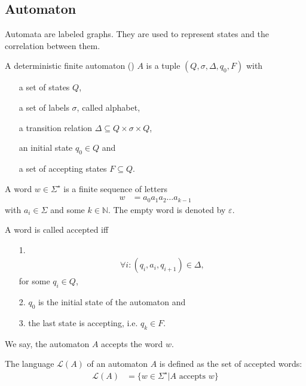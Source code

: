 \subsection{Automaton}\label{automaton_sec}
	Automata are labeled graphs. They are used to represent states and the correlation between them.
	\begin{mydef}\label{automaton}
		A \textnormal{deterministic finite automaton} (\dfa) $A$ is a tuple $(Q, \sigma, \Delta, q_0, F)$ with
		\begin{itemize}
			\item[] a set of states $Q$,
			\item [] a set of labels $\sigma$, called \textnormal{alphabet},
			\item[] a transition relation $\Delta \subseteq Q \times \sigma \times Q$,
			\item[] an initial state $q_0 \in Q$ and
			\item[] a set of accepting states $F \subseteq Q$.
		\end{itemize}
	\end{mydef}
	\begin{mydef}
		A \textnormal{word} $w \in \Sigma^{\star}$ is a finite sequence of letters
		\begin{align*}
			w	&= a_0a_1a_2 \ldots a_{k - 1}
		\end{align*}
		with $a_i \in \Sigma$ and some $k \in \mathbb{N}$. The empty word is denoted by $\varepsilon$.
		
		A word is called \textnormal{accepted} iff
		\begin{itemize}
			\item[1.] \begin{align*}
					\forall i: (q_i, a_i, q_{i + 1}) \in \Delta,
				\end{align*}
				for some $q_i \in Q$,
			\item[2.] $q_0$ is the initial state of the automaton and
			\item[3.] the last state is accepting, i.e. $q_k \in F$.
		\end{itemize}
		We say, the automaton $A$ accepts the word $w$.
	\end{mydef}
	\begin{mydef}
		The language $\mathcal{L}(A)$ of an automaton $A$ is defined as the set of accepted words:
		\begin{align*}
			\mathcal{L}(A)	&= \{w \in \Sigma^{\star} | A \text{ accepts } w\}
		\end{align*}
	\end{mydef}\quad\\
